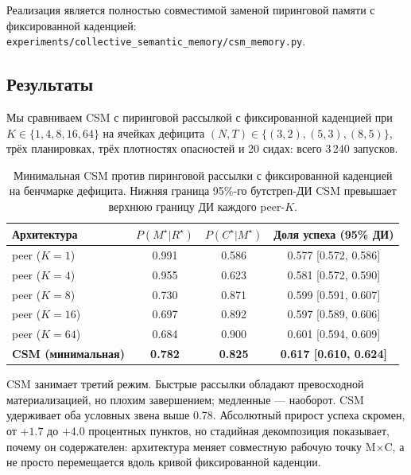 \documentclass{article}
\newcommand{\method}[1]{\texttt{#1}}
\begin{document}
Реализация является полностью совместимой заменой пиринговой памяти с
фиксированной каденцией:
\method{experiments/collective\_semantic\_memory/csm\_memory.py}.

\subsection{Результаты}

Мы сравниваем CSM с пиринговой рассылкой с фиксированной каденцией при
$K \in \{1,4,8,16,64\}$ на ячейках дефицита
$(N,T){\in}\{(3,2),(5,3),(8,5)\}$, трёх планировках, трёх плотностях
опасностей и 20 сидах: всего 3\,240 запусков.

\begin{table}[ht]
\caption{Минимальная CSM против пиринговой рассылки с фиксированной каденцией на бенчмарке дефицита. Нижняя граница 95\%-го бутстреп-ДИ CSM превышает верхнюю границу ДИ каждого peer-$K$.}
\label{tab:csm-results}
\centering
\small
\begin{tabular}{l c c c}
\toprule
Архитектура & $P(M^\star|R^\star)$ & $P(C^\star|M^\star)$ & Доля успеха (95\% ДИ) \\
\midrule
peer ($K{=}1$)  & 0.991 & 0.586 & 0.577 [0.572, 0.586] \\
peer ($K{=}4$)  & 0.955 & 0.623 & 0.581 [0.572, 0.590] \\
peer ($K{=}8$)  & 0.730 & 0.871 & 0.599 [0.591, 0.607] \\
peer ($K{=}16$) & 0.697 & 0.892 & 0.597 [0.589, 0.606] \\
peer ($K{=}64$) & 0.684 & 0.900 & 0.601 [0.594, 0.609] \\
\textbf{CSM (минимальная)} & \textbf{0.782} & \textbf{0.825} & \textbf{0.617 [0.610, 0.624]} \\
\bottomrule
\end{tabular}
\end{table}

CSM занимает третий режим. Быстрые рассылки обладают превосходной
материализацией, но плохим завершением; медленные --- наоборот. CSM
удерживает оба условных звена выше 0.78. Абсолютный прирост успеха
скромен, от $+1.7$ до $+4.0$ процентных пунктов, но стадийная
декомпозиция показывает, почему он содержателен: архитектура меняет
совместную рабочую точку M$\times$C, а не просто перемещается вдоль
кривой фиксированной каденции.
\end{document}
